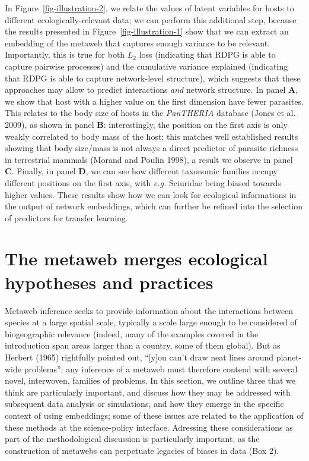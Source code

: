 \documentclass[
  letterpaper,
  DIV=11,
  numbers=noendperiod]{scrartcl}
\begin{document}
In Figure~\ref{fig-illustration-2}, we relate the values of latent
variables for hosts to different ecologically-relevant data; we can
perform this additional step, because the results presented in
Figure~\ref{fig-illustration-1} show that we can extract an embedding of
the metaweb that captures enough variance to be relevant. Importantly,
this is true for both \(L_2\) loss (indicating that RDPG is able to
capture pairwise processes) and the cumulative variance explained
(indicating that RDPG is able to capture network-level structure), which
suggests that these approaches may allow to predict interactions
\emph{and} network structure. In panel \textbf{A}, we show that host
with a higher value on the first dimension have fewer parasites. This
relates to the body size of hosts in the \emph{PanTHERIA} database
(Jones et al. 2009), as shown in panel \textbf{B}: interestingly, the
position on the first axis is only weakly correlated to body mass of the
host; this matches well established results showing that body size/mass
is not always a direct predictor of parasite richness in terrestrial
mammals (Morand and Poulin 1998), a result we observe in panel
\textbf{C}. Finally, in panel \textbf{D}, we can see how different
taxonomic families occupy different positions on the first axis, with
\emph{e.g.} Sciuridae being biased towards higher values. These results
show how we can look for ecological informations in the output of
network embeddings, which can further be refined into the selection of
predictors for transfer learning.

\hypertarget{the-metaweb-merges-ecological-hypotheses-and-practices}{%
\section{The metaweb merges ecological hypotheses and
practices}\label{the-metaweb-merges-ecological-hypotheses-and-practices}}

Metaweb inference seeks to provide information about the interactions
between species at a large spatial scale, typically a scale large enough
to be considered of biogeographic relevance (indeed, many of the
examples covered in the introduction span areas larger than a country,
some of them global). But as Herbert (1965) rightfully pointed out,
``{[}y{]}ou can't draw neat lines around planet-wide problems''; any
inference of a metaweb must therefore contend with several novel,
interwoven, families of problems. In this section, we outline three that
we think are particularly important, and discuss how they may be
addressed with subsequent data analysis or simulations, and how they
emerge in the specific context of using embeddings; some of these issues
are related to the application of these methods at the science-policy
interface. Adressing these considerations as part of the methodological
discussion is particularly important, as the construction of metawebs
can perpetuate legacies of biases in data (Box 2).
\end{document}
